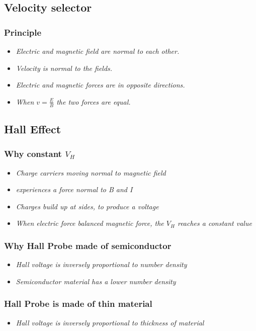 \documentclass[a4paper,9pt]{scrartcl}
\begin{document}
    \subsection{Velocity selector}

    \subsubsection{Principle}
    \begin{itemize}
        \item \textit{Electric and magnetic field are normal to each other.}
        \item \textit{Velocity is normal to the fields.}
        \item \textit{Electric and magnetic forces are in opposite directions.}
        \item \textit{When $v=\frac{E}{B}$ the two forces are equal.}
    \end{itemize}

    \subsection{Hall Effect}

    \subsubsection{Why constant $V_H$}
    \begin{itemize}
        \item \textit{Charge carriers moving normal to magnetic field}
        \item \textit{experiences a force normal to B and I}
        \item \textit{Charges build up at sides, to produce a voltage}
        \item \textit{When electric force balanced magnetic force, the $V_H$ reaches a constant value}
    \end{itemize}

    \subsubsection{Why Hall Probe made of semiconductor}
    \begin{itemize}
        \item \textit{Hall voltage is inversely proportional to number density}
        \item \textit{Semiconductor material has a lower number density}
    \end{itemize}

    \subsubsection{Hall Probe is made of thin material}
    \begin{itemize}
        \item \textit{Hall voltage is inversely proportional to thickness of material}
    \end{itemize}
\end{document}
